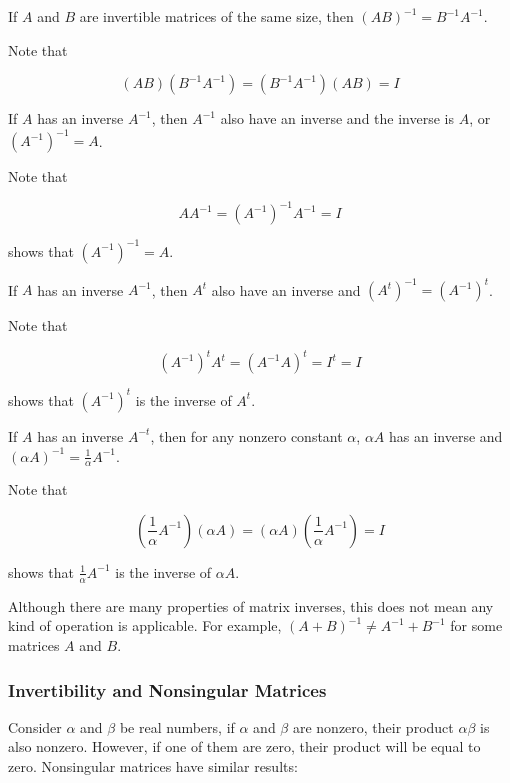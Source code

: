 \documentclass[a4paper,12pt]{article}
\begin{document}
\begin{pst}
  If $A$ and $B$ are invertible matrices of the same size, then $(AB)^{-1}=B^{-1}A^{-1}$.\n

  \prf Note that

  $$(AB)(B^{-1}A^{-1})=(B^{-1}A^{-1})(AB)=I$$
\end{pst}\n

\begin{pst}
  If $A$ has an inverse $A^{-1}$, then $A^{-1}$ also have an inverse and the inverse is $A$, or $(A^{-1})^{-1}=A$.\n

  \prf Note that

  $$AA^{-1}=(A^{-1})^{-1}A^{-1}=I$$\s

  shows that $(A^{-1})^{-1}=A$.
\end{pst}\n

\begin{pst}
  If $A$ has an inverse $A^{-1}$, then $A^{t}$ also have an inverse and $(A^{t})^{-1}=(A^{-1})^{t}$.\n

  \prf Note that

  $$(A^{-1})^{t}A^{t}=(A^{-1}A)^{t}=I^{t}=I$$\s

  shows that $(A^{-1})^{t}$ is the inverse of $A^{t}$.
\end{pst}\n

\begin{pst}
  If $A$ has an inverse $A^{-t}$, then for any nonzero constant $\alpha$, $\alpha A$ has an inverse and $(\alpha A)^{-1}=\frac{1}{\alpha}A^{-1}$.\n

  \prf Note that

  $$(\frac{1}{\alpha}A^{-1})(\alpha A)=(\alpha A)(\frac{1}{\alpha}A^{-1})=I$$\s

  shows that $\frac{1}{\alpha}A^{-1}$ is the inverse of $\alpha A$.
\end{pst}\n

Although there are many properties of matrix inverses, this does not mean any kind of operation is applicable. For example, $(A+B)^{-1}\neq A^{-1}+B^{-1}$ for some matrices $A$ and $B$.

\subsubsection{Invertibility and Nonsingular Matrices}
Consider $\alpha$ and $\beta$ be real numbers, if $\alpha$ and $\beta$ are nonzero, their product $\alpha\beta$ is also nonzero. However, if one of them are zero, their product will be equal to zero. Nonsingular matrices have similar results:\n
\end{document}
